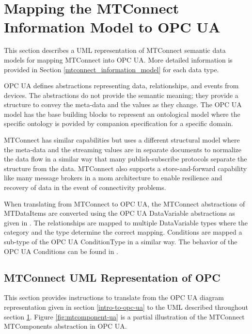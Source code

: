 \clearpage
\section{Mapping the MTConnect Information Model to OPC UA} 
\label{mtconnect-mapping}

This section describes a UML representation of MTConnect semantic data models for mapping MTConnect into OPC UA. More detailed information is provided in Section \ref{mtconnect_information_model} for each data type.

OPC UA defines abstractions representing data, relationships, and events from devices. The abstractions do not provide the semantic meaning; they provide a structure to convey the meta-data and the values as they change. The OPC UA model has the base building blocks to represent an ontological model where the specific ontology is povided by companion specification for a specific domain.

MTConnect has similar capabilities but uses a different structural model where the meta-data and the streaming values are in separate documents to normalize the data flow in a similar way that many publish-subscribe protocols separate the structure from the data. MTConnect also supports a store-and-forward capability like many message brokers in a \gls{mom} architecture to enable resilience and recovery of data in the event of connectivity problems.

When translating from MTConnect to OPC UA, the MTConnect abstractions of \glspl{MTDataItem} are converted using the OPC UA  \gls{DataVariable} abstractions as given in \cite{UAPart8}.  The relationships are mapped to multiple \gls{DataVariable} types where the category and the type determine the correct mapping. Conditions are mapped a sub-type of the OPC UA \gls{ConditionType} in a similar way. The behavior of the OPC UA \glspl{Condition} can be found in \cite{UAPart9}.

\subsection{MTConnect UML Representation of OPC}

This section provides instructions to translate from the OPC UA diagram representation given in section \ref{intro-to-opc-ua} to the UML described throughout section \ref{mtconnect-mapping}. Figure \ref{fig:mtcomponent-ua} is a partial illustration of the MTConnect \glspl{MTComponent} abstraction in OPC UA.



